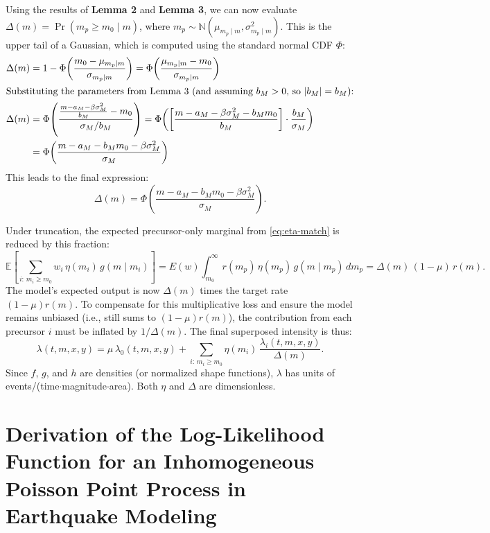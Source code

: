 \documentclass[linenum,doublespace,onecolumn]{SSA-SRL}
\theoremstyle{lemma}
\def\N{\mathbb{N}}
\begin{document}
Using the results of \textbf{Lemma 2} and \textbf{Lemma 3}, we can now evaluate $\Delta(m) = \Pr(m_p\ge m_0\mid m)$, where $m_p \sim \N(\mu_{m_p\mid m}, \sigma_{m_p\mid m}^2)$. This is the upper tail of a Gaussian, which is computed using the standard normal CDF $\Phi$:
\begin{align}
  \Delta(m) &= 1 - \Phi\!\left(\frac{m_0 - \mu_{m_p\mid m}}{\sigma_{m_p\mid m}}\right)
          = \Phi\!\left(\frac{\mu_{m_p\mid m}-m_0}{\sigma_{m_p\mid m}}\right) \nonumber \\
\intertext{Substituting the parameters from Lemma 3 (and assuming $b_M > 0$, so $|b_M|=b_M$):}
  \Delta(m) &= \Phi\!\left(\frac{ \frac{m-a_M-\beta\sigma_M^2}{b_M} - m_0}{\sigma_M / b_M}\right) 
          = \Phi\!\left( \left[ \frac{m-a_M-\beta\sigma_M^2 - b_M m_0}{b_M} \right] \cdot \frac{b_M}{\sigma_M} \right) \nonumber \\
          &= \Phi\!\left(\frac{m-a_M-b_M m_0-\beta\sigma_M^2}{\sigma_M}\right) \nonumber
\end{align}
This leads to the final expression:
\begin{equation}\label{eq:Delta-final}
  \boxed{\quad
  \Delta(m) = \Phi\!\left(\frac{m-a_M-b_M m_0-\beta\sigma_M^2}{\sigma_M}\right).\quad}
\end{equation}

Under truncation, the expected precursor-only marginal from \eqref{eq:eta-match} is reduced by this fraction:
\[
  \mathbb{E}\!\left[\sum_{i:\,m_i\ge m_0} w_i\,\eta(m_i)\,g(m\mid m_i)\right]
  =E(w)\int_{m_0}^{\infty} r(m_p)\,\eta(m_p)\,g(m\mid m_p)\,dm_p
  =\Delta(m)\,(1-\mu)\,r(m).
\]
The model's expected output is now $\Delta(m)$ times the target rate $(1-\mu)r(m)$. To compensate for this multiplicative loss and ensure the model remains unbiased (i.e., still sums to $(1-\mu)r(m)$), the contribution from each precursor $i$ must be inflated by $1/\Delta(m)$. The final superposed intensity is thus:
\begin{equation}\label{eq:lambda-superpose}
  \lambda(t,m,x,y)=\mu\,\lambda_0(t,m,x,y)+
  \sum_{i:\,m_i\ge m_0}\eta(m_i)\,
  \frac{\lambda_i(t,m,x,y)}{\Delta(m)}.
\end{equation}
Since $f$, $g$, and $h$ are densities (or normalized shape functions), $\lambda$ has units of
events/(time$\cdot$magnitude$\cdot$area). Both $\eta$ and $\Delta$ are dimensionless. 

\section{Derivation of the Log-Likelihood Function for an Inhomogeneous Poisson Point Process in Earthquake Modeling} \label{sec:derive_loglikelihood}
\end{document}
